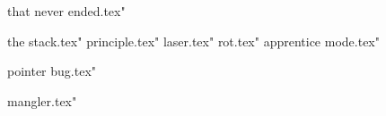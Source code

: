 

 that never ended.tex"



 the stack.tex"
 principle.tex"
 laser.tex"
 rot.tex"
 apprentice mode.tex"



 pointer bug.tex"





 mangler.tex"

